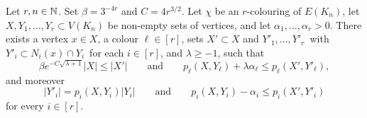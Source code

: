 \begin{lemma}
  \label{lem:key-lemma} %
  Let $r, n\in\mathbb{N}$. Set $\beta = 3^{-4r}$ and $C = 4r^{3/2}$.
  Let\/ $\chi$ be an\/ $r$-colouring of\/ $E(K_n)$, let\/ $X,Y_1,\ldots,Y_r \subset V(K_n)$ be non-empty sets of vertices, and let $\alpha_1,\ldots,\alpha_r > 0$. There exists a vertex $x \in X$, a colour $\ell \in [r]$, sets $X' \subset X$ and\/ $Y'_1,\ldots,Y'_r\,$ with\/ $Y'_i \subset N_i(x) \cap Y_i\,$ for each $i \in [r]$, and\/ $\lambda \ge -1$, such that
  \begin{equation}\label{eq:key:ell}
    \beta e^{- C \sqrt{\lambda + 1}} |X| \le |X'| \qquad \text{and} \qquad p_\ell(X,Y_\ell) + \lambda \alpha_\ell \le p_\ell( X', Y'_\ell ) ,
  \end{equation}
  and moreover
  \begin{equation}\label{eq:key:alli}
    |Y'_i| = p_i(X,Y_i) |Y_i| \qquad \text{and} \qquad  p_i(X,Y_i) - \alpha_i \le p_i( X', Y'_i )
  \end{equation}
  for every $i \in [r]$.
\end{lemma}
%
